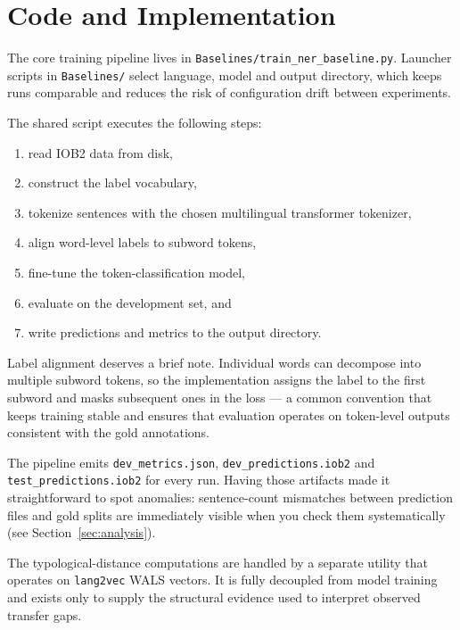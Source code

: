 \section{Code and Implementation}
The core training pipeline lives in \texttt{Baselines/train\_ner\_baseline.py}. Launcher scripts in \texttt{Baselines/} select language, model and output directory, which keeps runs comparable and reduces the risk of configuration drift between experiments.

The shared script executes the following steps:
\begin{enumerate}
  \item read IOB2 data from disk,
  \item construct the label vocabulary,
  \item tokenize sentences with the chosen multilingual transformer tokenizer,
  \item align word-level labels to subword tokens,
  \item fine-tune the token-classification model,
  \item evaluate on the development set, and
  \item write predictions and metrics to the output directory.
\end{enumerate}

Label alignment deserves a brief note. Individual words can decompose into multiple subword tokens, so the implementation assigns the label to the first subword and masks subsequent ones in the loss — a common convention that keeps training stable and ensures that evaluation operates on token-level outputs consistent with the gold annotations.

The pipeline emits \texttt{dev\_metrics.json}, \texttt{dev\_predictions.iob2} and \texttt{test\_predictions.iob2} for every run. Having those artifacts made it straightforward to spot anomalies: sentence-count mismatches between prediction files and gold splits are immediately visible when you check them systematically (see Section~\ref{sec:analysis}).

The typological-distance computations are handled by a separate utility that operates on \texttt{lang2vec} WALS vectors. It is fully decoupled from model training and exists only to supply the structural evidence used to interpret observed transfer gaps.

